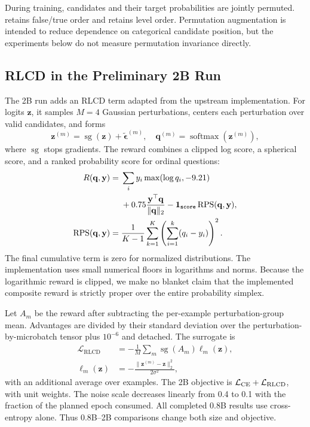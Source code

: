During training, \choice{} candidates and their target probabilities are jointly permuted. \noul{} retains false/true order and \score{} retains level order. Permutation augmentation is intended to reduce dependence on categorical candidate position, but the experiments below do not measure permutation invariance directly.

\subsection{RLCD in the Preliminary 2B Run}
\label{sec:rlcd}
The 2B run adds an RLCD term adapted from the upstream implementation. For logits $\mathbf{z}$, it samples $M=4$ Gaussian perturbations, centers each perturbation over valid candidates, and forms
\begin{equation}
\mathbf{z}^{(m)}=\operatorname{sg}(\mathbf{z})+\tilde{\boldsymbol\epsilon}^{(m)},
\quad \mathbf{q}^{(m)}=\operatorname{softmax}(\mathbf{z}^{(m)}),
\end{equation}
where $\operatorname{sg}$ stops gradients. The reward combines a clipped log score, a spherical score, and a ranked probability score for ordinal questions:
\begin{align}
R(\mathbf{q},\mathbf{y})={}&\sum_i y_i\max(\log q_i,-9.21)\nonumber\\
&+0.75\frac{\mathbf{y}^{\top}\mathbf{q}}{\|\mathbf{q}\|_2}
-\mathbf{1}_{\texttt{score}}\operatorname{RPS}(\mathbf{q},\mathbf{y}),\label{eq:reward}\\
\operatorname{RPS}(\mathbf{q},\mathbf{y})={}&\frac{1}{K-1}\sum_{k=1}^{K}
\left(\sum_{i=1}^{k}(q_i-y_i)\right)^2.\label{eq:rps}
\end{align}
The final cumulative term is zero for normalized distributions. The implementation uses small numerical floors in logarithms and norms. Because the logarithmic reward is clipped, we make no blanket claim that the implemented composite reward is strictly proper over the entire probability simplex.

Let $A_m$ be the reward after subtracting the per-example perturbation-group mean. Advantages are divided by their standard deviation over the perturbation-by-microbatch tensor plus $10^{-6}$ and detached. The surrogate is
\begin{align}
\mathcal{L}_{\mathrm{RLCD}}&=-\frac1M\sum_m\operatorname{sg}(A_m)\ell_m(\mathbf{z}),\\
\ell_m(\mathbf{z})&=-\frac{\|\mathbf{z}^{(m)}-\mathbf{z}\|_2^2}{2\sigma^2},\label{eq:rlcd}
\end{align}
with an additional average over examples. The 2B objective is $\mathcal{L}_{\mathrm{CE}}+\mathcal{L}_{\mathrm{RLCD}}$, with unit weights. The noise scale decreases linearly from 0.4 to 0.1 with the fraction of the planned epoch consumed. All completed 0.8B results use cross-entropy alone. Thus 0.8B--2B comparisons change both size and objective.

